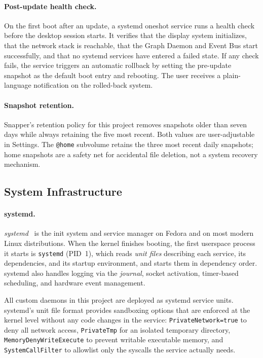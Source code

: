 \paragraph{Post-update health check.}
On the first boot after an update, a systemd oneshot service runs a health check
before the desktop session starts. It verifies that the display system
initializes, that the network stack is reachable, that the Graph Daemon and
Event Bus start successfully, and that no systemd services have entered a failed
state. If any check fails, the service triggers an automatic rollback by setting
the pre-update snapshot as the default boot entry and rebooting. The user
receives a plain-language notification on the rolled-back system.

\paragraph{Snapshot retention.}
Snapper's retention policy for this project removes snapshots older than seven
days while always retaining the five most recent. Both values are user-adjustable
in Settings. The \texttt{@home} subvolume retains the three most recent daily
snapshots; home snapshots are a safety net for accidental file deletion, not a
system recovery mechanism.

\subsection{System Infrastructure}
\label{sec:infra}

\paragraph{systemd.}
\emph{systemd}~\cite{archwiki:systemd}
is the init system and service manager on Fedora and on
most modern Linux distributions. When the kernel finishes booting, the first
userspace process it starts is \texttt{systemd} (PID~1), which reads
\emph{unit files} describing each service, its dependencies, and its startup
environment, and starts them in dependency order. systemd also handles logging
via the \emph{journal}, socket activation, timer-based scheduling, and hardware
event management.

All custom daemons in this project are deployed as systemd service units.
systemd's unit file format provides sandboxing options that are enforced at the
kernel level without any code changes in the service: \texttt{PrivateNetwork=true}
to deny all network access, \texttt{PrivateTmp} for an isolated temporary
directory, \texttt{MemoryDenyWriteExecute} to prevent writable executable memory,
and \texttt{SystemCallFilter} to allowlist only the syscalls the service
actually needs.

